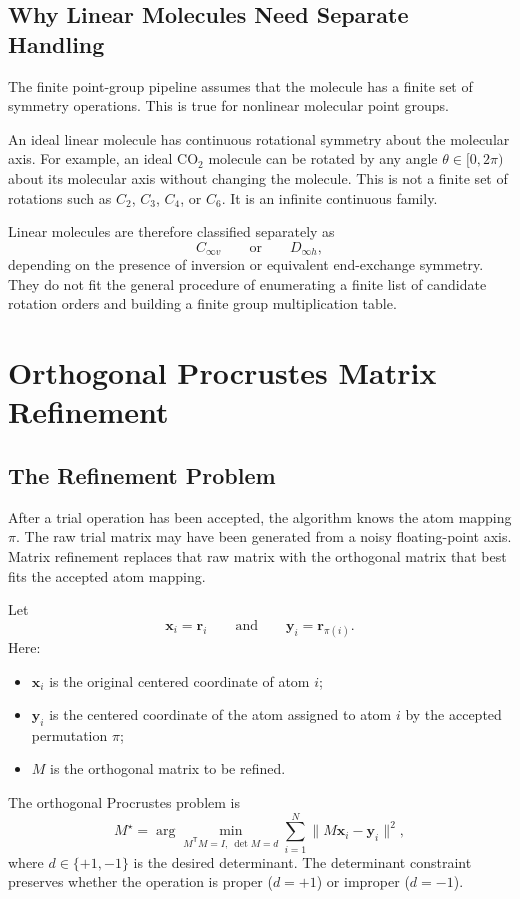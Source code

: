 \documentclass[11pt]{article}
\newcommand{\T}{\mathsf{T}}
\begin{document}
\subsection{Why Linear Molecules Need Separate Handling}

The finite point-group pipeline assumes that the molecule has a finite set of
symmetry operations.  This is true for nonlinear molecular point groups.

An ideal linear molecule has continuous rotational symmetry about the molecular
axis.  For example, an ideal \(\mathrm{CO}_2\) molecule can be rotated by any
angle \(\theta\in[0,2\pi)\) about its molecular axis without changing the
molecule.  This is not a finite set of rotations such as \(C_2\), \(C_3\),
\(C_4\), or \(C_6\).  It is an infinite continuous family.

Linear molecules are therefore classified separately as
\[
    C_{\infty v}
    \qquad\text{or}\qquad
    D_{\infty h},
\]
depending on the presence of inversion or equivalent end-exchange symmetry.
They do not fit the general procedure of enumerating a finite list of candidate
rotation orders and building a finite group multiplication table.

\section{Orthogonal Procrustes Matrix Refinement}

\subsection{The Refinement Problem}

After a trial operation has been accepted, the algorithm knows the atom mapping
\(\pi\).  The raw trial matrix may have been generated from a noisy
floating-point axis.  Matrix refinement replaces that raw matrix with the
orthogonal matrix that best fits the accepted atom mapping.

Let
\[
    \mathbf x_i=\mathbf r_i
    \qquad\text{and}\qquad
    \mathbf y_i=\mathbf r_{\pi(i)}.
\]
Here:
\begin{itemize}
    \item \(\mathbf x_i\) is the original centered coordinate of atom \(i\);
    \item \(\mathbf y_i\) is the centered coordinate of the atom assigned to
    atom \(i\) by the accepted permutation \(\pi\);
    \item \(M\) is the orthogonal matrix to be refined.
\end{itemize}
The orthogonal Procrustes problem is
\[
    M^\star
    =
    \arg\min_{M^{\T}M=I,\ \det M=d}
    \sum_{i=1}^{N}
    \lVert M\mathbf x_i-\mathbf y_i\rVert^2,
\]
where \(d\in\{+1,-1\}\) is the desired determinant.  The determinant constraint
preserves whether the operation is proper (\(d=+1\)) or improper (\(d=-1\)).
\end{document}
